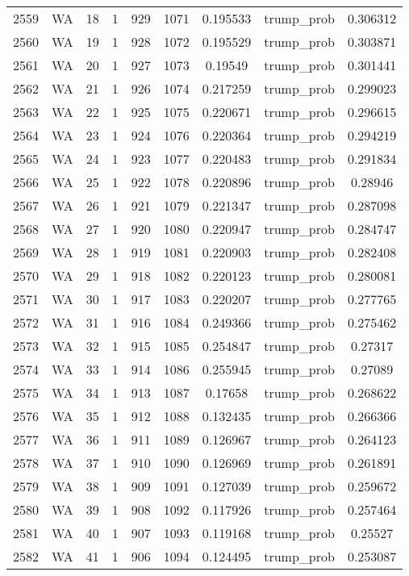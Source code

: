 \documentclass[12pt,a4paper]{article}
\begin{document}
\begin{tabular}{r|cccccccc}
	2559 & WA & 18 & 1 & 929 & 1071 & 0.195533 & trump\_prob & 0.306312 \\
	2560 & WA & 19 & 1 & 928 & 1072 & 0.195529 & trump\_prob & 0.303871 \\
	2561 & WA & 20 & 1 & 927 & 1073 & 0.19549 & trump\_prob & 0.301441 \\
	2562 & WA & 21 & 1 & 926 & 1074 & 0.217259 & trump\_prob & 0.299023 \\
	2563 & WA & 22 & 1 & 925 & 1075 & 0.220671 & trump\_prob & 0.296615 \\
	2564 & WA & 23 & 1 & 924 & 1076 & 0.220364 & trump\_prob & 0.294219 \\
	2565 & WA & 24 & 1 & 923 & 1077 & 0.220483 & trump\_prob & 0.291834 \\
	2566 & WA & 25 & 1 & 922 & 1078 & 0.220896 & trump\_prob & 0.28946 \\
	2567 & WA & 26 & 1 & 921 & 1079 & 0.221347 & trump\_prob & 0.287098 \\
	2568 & WA & 27 & 1 & 920 & 1080 & 0.220947 & trump\_prob & 0.284747 \\
	2569 & WA & 28 & 1 & 919 & 1081 & 0.220903 & trump\_prob & 0.282408 \\
	2570 & WA & 29 & 1 & 918 & 1082 & 0.220123 & trump\_prob & 0.280081 \\
	2571 & WA & 30 & 1 & 917 & 1083 & 0.220207 & trump\_prob & 0.277765 \\
	2572 & WA & 31 & 1 & 916 & 1084 & 0.249366 & trump\_prob & 0.275462 \\
	2573 & WA & 32 & 1 & 915 & 1085 & 0.254847 & trump\_prob & 0.27317 \\
	2574 & WA & 33 & 1 & 914 & 1086 & 0.255945 & trump\_prob & 0.27089 \\
	2575 & WA & 34 & 1 & 913 & 1087 & 0.17658 & trump\_prob & 0.268622 \\
	2576 & WA & 35 & 1 & 912 & 1088 & 0.132435 & trump\_prob & 0.266366 \\
	2577 & WA & 36 & 1 & 911 & 1089 & 0.126967 & trump\_prob & 0.264123 \\
	2578 & WA & 37 & 1 & 910 & 1090 & 0.126969 & trump\_prob & 0.261891 \\
	2579 & WA & 38 & 1 & 909 & 1091 & 0.127039 & trump\_prob & 0.259672 \\
	2580 & WA & 39 & 1 & 908 & 1092 & 0.117926 & trump\_prob & 0.257464 \\
	2581 & WA & 40 & 1 & 907 & 1093 & 0.119168 & trump\_prob & 0.25527 \\
	2582 & WA & 41 & 1 & 906 & 1094 & 0.124495 & trump\_prob & 0.253087 \\

\end{tabular}
\end{document}
